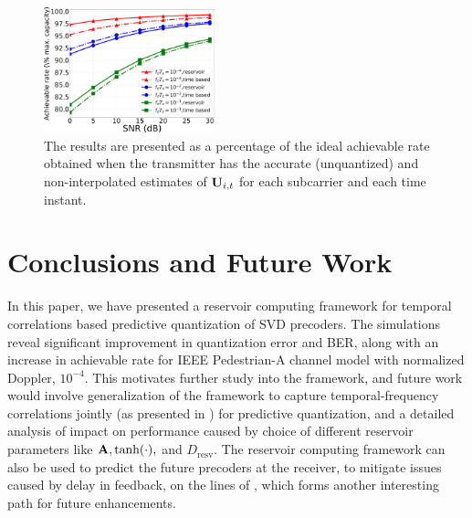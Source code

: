 \documentclass[conference]{IEEEtran}
\begin{document}
\begin{figure}
\centering
\includegraphics[width=0.44\textwidth]{images/hopRate.pdf}
\caption{The results are presented as a percentage of the ideal achievable rate obtained when the transmitter has the accurate (unquantized) and non-interpolated estimates of ${\bf U}_{i,t}$ for each subcarrier and each time instant.}
\label{achievrate}
\vspace{-10pt}
\end{figure}
\section{Conclusions and Future Work}
\label{section5}
In this paper, we have presented a reservoir computing framework for temporal correlations based predictive quantization of SVD precoders.
The simulations reveal significant improvement in quantization error and BER, along with an increase in achievable rate for IEEE Pedestrian-A channel model with normalized Doppler, $10^{-4}$.
This motivates further study into the framework, and future work would involve generalization of the framework to capture temporal-frequency correlations jointly (as presented in \cite{Gupt1905:Predictive}) for predictive quantization, and a detailed analysis of impact on performance caused by choice of different reservoir parameters like ${\bf A},\text{tanh}(\cdot),$ and $D_{\text{resv}}$.
The reservoir computing framework can also be used to predict the future precoders at the receiver, to mitigate issues caused by delay in feedback, on the lines of \cite{chang2011adaptive}, which forms another interesting path for future enhancements.
\vspace{-5pt}



\renewcommand{\bibfont}{\footnotesize}


\end{document}
